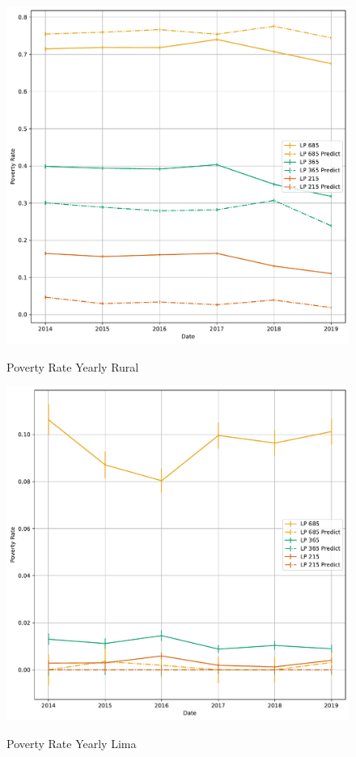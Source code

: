 \begin{figure}[H]
    \centering
    \caption{Poverty Rate Yearly Rural}
    \includegraphics[width=\textwidth]{../figures/fig8b_poverty_rate_time_series_rural.pdf}
    \label{fig:enter-label}
\end{figure}


\begin{figure}[H]
    \centering
    \caption{Poverty Rate Yearly Lima}
    \includegraphics[width=\textwidth]{../figures/fig8c_poverty_rate_time_series_lima.pdf}
    \label{fig:enter-label}
\end{figure}



